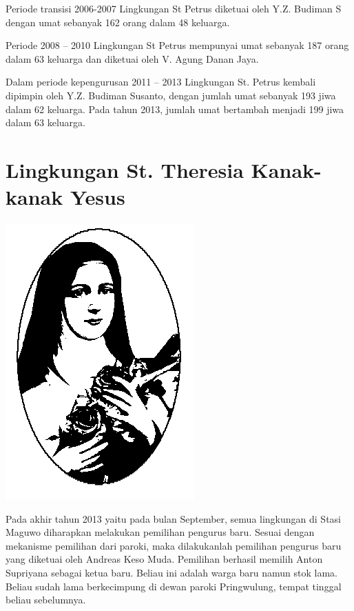 Periode transisi 2006-2007 Lingkungan St Petrus diketuai oleh Y.Z.
Budiman S dengan umat sebanyak 162 orang dalam 48 keluarga. 

Periode 2008 -- 2010 Lingkungan St Petrus mempunyai umat sebanyak 187
orang dalam 63 keluarga dan diketuai oleh V. Agung Danan Jaya.

Dalam  periode kepengurusan 2011 -- 2013 Lingkungan St. Petrus kembali
dipimpin oleh Y.Z. Budiman Susanto, dengan jumlah umat sebanyak 193
jiwa dalam 62 keluarga. Pada tahun 2013, jumlah umat bertambah menjadi
199 jiwa dalam 63 keluarga.
\normalsize

\section{Lingkungan St. Theresia Kanak-kanak Yesus}
\begin{floatingfigure}[l]{2cm}
\begin{center}
\includegraphics[scale=1]{theresia-logo.png}
\end{center}
\end{floatingfigure}
Pada akhir tahun 2013 yaitu pada bulan September, semua lingkungan di Stasi Maguwo 
diharapkan melakukan pemilihan pengurus baru. Sesuai dengan mekanisme pemilihan dari paroki, 
maka dilakukanlah pemilihan pengurus baru yang diketuai oleh Andreas Keso Muda.
Pemilihan berhasil memilih Anton Supriyana sebagai ketua baru. Beliau ini adalah warga baru namun stok lama. Beliau sudah lama berkecimpung di dewan paroki Pringwulung, tempat tinggal beliau sebelumnya.


